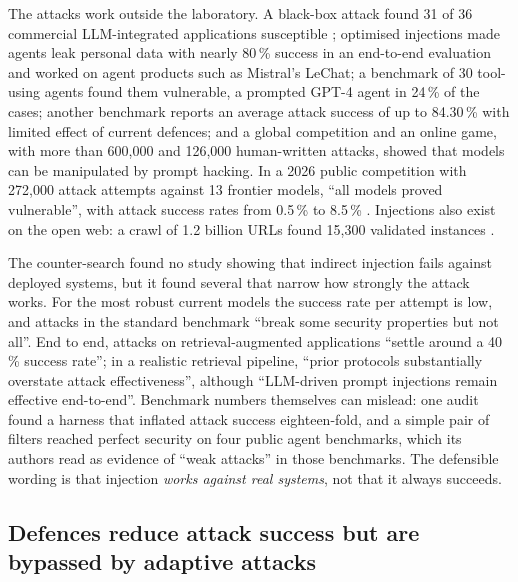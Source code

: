 The attacks work outside the laboratory. A black-box attack found 31 of
36 commercial LLM-integrated applications susceptible
\autocite{Liu2023HouYi}; optimised injections made agents leak personal data with nearly 80\,\%
success in an end-to-end evaluation and worked on agent products such as
Mistral's LeChat\autocite{Fu2024Imprompter};
a benchmark of 30 tool-using agents found them vulnerable, a
prompted GPT-4 agent in 24\,\% of the cases\autocite{Zhan2024InjecAgent};
another benchmark reports an average attack success of up to 84.30\,\%
with limited effect of current defences\autocite{Zhang2025ASB}; and a global
competition and an online game, with more than 600,000 and 126,000 human-written
attacks, showed that models can be manipulated by prompt
hacking\autocite{Schulhoff2023HackAPrompt,Toyer2024TensorTrust}.
In a 2026 public competition with 272,000 attack attempts against 13
frontier models, \enquote{all models proved vulnerable}, with
attack success rates from 0.5\,\% to 8.5\,\%
\autocite{Dziemian2026Competition}. Injections also exist on the open
web: a crawl of 1.2 billion URLs found 15,300 validated instances
\autocite{Khodayari2026Wild}.

The counter-search found no study showing that indirect injection fails
against deployed systems, but it found several that narrow how strongly
the attack works. For the most robust current models the success rate per
attempt is low\autocite{Dziemian2026Competition}, and attacks in the
standard benchmark \enquote{break some security properties but not
all}\autocite{Debenedetti2024AgentDojo}. End to end, attacks on
retrieval-augmented applications \enquote{settle around a 40\,\% success
rate}\autocite{DeStefano2026RagnRoll}; in a realistic retrieval pipeline,
\enquote{prior protocols substantially overstate attack effectiveness},
although \enquote{LLM-driven prompt injections remain effective
end-to-end}\autocite{Yin2026Generator}. Benchmark numbers themselves can
mislead: one audit found a harness that inflated attack success
eighteen-fold\autocite{Shaw2026SilentFailures}, and a simple pair of
filters reached perfect security on four public agent benchmarks, which
its authors read as evidence of \enquote{weak attacks} in those
benchmarks\autocite{Bhagwatkar2025Firewalls}. The defensible wording is
that injection \emph{works against real systems}, not that it always
succeeds.

\subsection{Defences reduce attack success but are bypassed by adaptive attacks}

